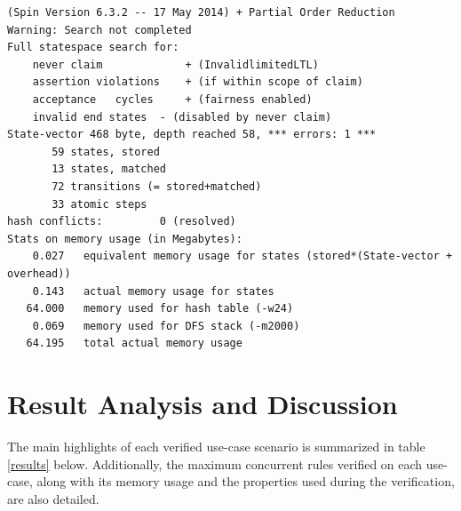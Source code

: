 \singlespacing
\begin{lstlisting}[caption=Invalid Limited Bolt-on-Rules Plan Verification,
  label=InvalidLimitedResult]
(Spin Version 6.3.2 -- 17 May 2014) + Partial Order Reduction
Warning: Search not completed
Full statespace search for:
	never claim         	+ (InvalidlimitedLTL)
	assertion violations	+ (if within scope of claim)
	acceptance   cycles 	+ (fairness enabled)
	invalid end states	- (disabled by never claim)
State-vector 468 byte, depth reached 58, *** errors: 1 ***
       59 states, stored
       13 states, matched
       72 transitions (= stored+matched)
       33 atomic steps
hash conflicts:         0 (resolved)
Stats on memory usage (in Megabytes):
    0.027	equivalent memory usage for states (stored*(State-vector + overhead))
    0.143	actual memory usage for states
   64.000	memory used for hash table (-w24)
    0.069	memory used for DFS stack (-m2000)
   64.195	total actual memory usage
\end{lstlisting}
\doublespacing

\section{Result Analysis and Discussion}
\noindent
The main highlights of each verified use-case scenario is summarized in table \ref{results} below. Additionally, the maximum concurrent rules verified on each use-case, along with its memory usage and the properties used during the verification, are also detailed. 

